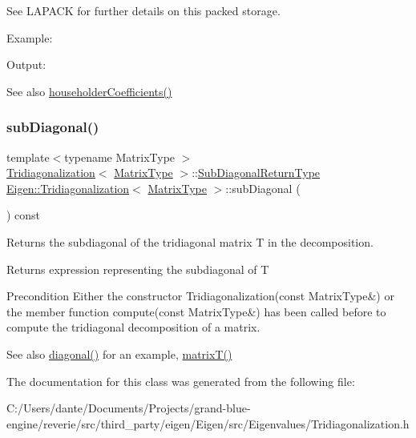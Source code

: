 See L\+A\+P\+A\+CK for further details on this packed storage.

Example\+: 
\begin{DoxyCodeInclude}{0}
\end{DoxyCodeInclude}
 Output\+: 
\begin{DoxyVerbInclude}
\end{DoxyVerbInclude}


\begin{DoxySeeAlso}{See also}
\mbox{\hyperlink{class_eigen_1_1_tridiagonalization_ac95b4e43dcf6c3c5074b8bea4fc67887}{householder\+Coefficients()}} 
\end{DoxySeeAlso}
\mbox{\label{class_eigen_1_1_tridiagonalization_ac423dbb91157c159bdcb4b5a8371232e}} 
\subsubsection{\texorpdfstring{subDiagonal()}{subDiagonal()}}
{\footnotesize\ttfamily template$<$typename Matrix\+Type $>$ \\
\mbox{\hyperlink{class_eigen_1_1_tridiagonalization}{Tridiagonalization}}$<$ \mbox{\hyperlink{class_eigen_1_1_tridiagonalization_add0f4b2216d0ea8ee0f7d8525deaf0a9}{Matrix\+Type}} $>$\+::\mbox{\hyperlink{struct_eigen_1_1internal_1_1true__type}{Sub\+Diagonal\+Return\+Type}} \mbox{\hyperlink{class_eigen_1_1_tridiagonalization}{Eigen\+::\+Tridiagonalization}}$<$ \mbox{\hyperlink{class_eigen_1_1_tridiagonalization_add0f4b2216d0ea8ee0f7d8525deaf0a9}{Matrix\+Type}} $>$\+::sub\+Diagonal (\begin{DoxyParamCaption}{ }\end{DoxyParamCaption}) const}



Returns the subdiagonal of the tridiagonal matrix T in the decomposition. 

\begin{DoxyReturn}{Returns}
expression representing the subdiagonal of T
\end{DoxyReturn}
\begin{DoxyPrecond}{Precondition}
Either the constructor Tridiagonalization(const Matrix\+Type\&) or the member function compute(const Matrix\+Type\&) has been called before to compute the tridiagonal decomposition of a matrix.
\end{DoxyPrecond}
\begin{DoxySeeAlso}{See also}
\mbox{\hyperlink{class_eigen_1_1_tridiagonalization_a0b7ff4860aa6f7c0761b1059c012fd8e}{diagonal()}} for an example, \mbox{\hyperlink{class_eigen_1_1_tridiagonalization_a6eb5ef94b8b9bb013c0e69b6df56d0df}{matrix\+T()}} 
\end{DoxySeeAlso}


The documentation for this class was generated from the following file\+:\begin{DoxyCompactItemize}
\item 
C\+:/\+Users/dante/\+Documents/\+Projects/grand-\/blue-\/engine/reverie/src/third\+\_\+party/eigen/\+Eigen/src/\+Eigenvalues/Tridiagonalization.\+h\end{DoxyCompactItemize}
